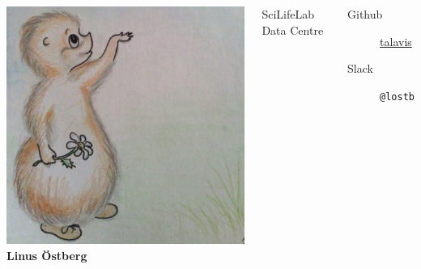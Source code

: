 \documentclass{dcpresentation}
\begin{document}
\begin{frame}
 \begin{columns}
  \includegraphics[width=\textwidth]{img/creature.jpeg}
  {\Large \bf Linus Östberg}
  
  {\small SciLifeLab Data Centre}

  \vspace{20pt}
  
  \begin{description}
   \item[Github] \href{https://github.com/talavis}{talavis}
   \item[Slack] \texttt{@lostb}
  \end{description}
 \end{columns}
\end{frame}
\end{document}
